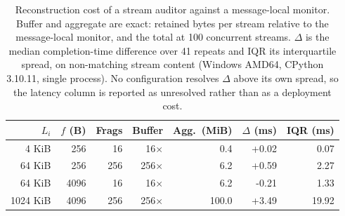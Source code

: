 \begin{table}[t]
  \caption{Reconstruction cost of a stream auditor against a message-local
  monitor. Buffer and aggregate are exact: retained bytes per stream relative to
  the message-local monitor, and the total at 100 concurrent streams.
  $\Delta$ is the median completion-time difference over 41 repeats and
  IQR its interquartile spread, on non-matching stream content (Windows AMD64, CPython 3.10.11,
  single process). No configuration resolves $\Delta$ above its own spread, so
  the latency column is reported as unresolved rather than as a deployment cost.}
  \label{tab:recon-cost}
  \centering\footnotesize
  \setlength{\tabcolsep}{3pt}
  \begin{tabular}{@{}rrrrrrr@{}}
    \toprule
    $L_i$ & $f$ (B) & Frags & Buffer & Agg.\ (MiB) & $\Delta$ (ms) & IQR (ms) \\
    \midrule
    4 KiB & 256 & 16 & 16$\times$ & 0.4 & +0.02 & 0.07 \\
    64 KiB & 256 & 256 & 256$\times$ & 6.2 & +0.59 & 2.27 \\
    64 KiB & 4096 & 16 & 16$\times$ & 6.2 & -0.21 & 1.33 \\
    1024 KiB & 4096 & 256 & 256$\times$ & 100.0 & +3.49 & 19.92 \\
    \bottomrule
  \end{tabular}
\end{table}
